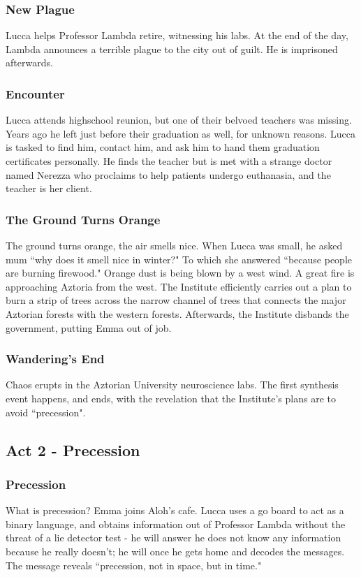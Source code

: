 \documentclass[11pt]{article}
\begin{document}
		\subsubsection{New Plague}
		Lucca helps Professor Lambda retire, witnessing his labs.
		At the end of the day, Lambda announces a terrible plague to the city out of guilt. 
		He is imprisoned afterwards.
		\subsubsection{Encounter}
		Lucca attends highschool reunion, but one of their belvoed teachers was missing.
		Years ago he left just before their graduation as well, for unknown reasons.
		Lucca is tasked to find him, contact him, and ask him to hand them graduation certificates personally.
		He finds the teacher but is met with a strange doctor named Nerezza who proclaims to help patients undergo euthanasia, and the teacher is her client.
		\subsubsection{The Ground Turns Orange}
		The ground turns orange, the air smells nice.
		When Lucca was small, he asked mum ``why does it smell nice in winter?"
		To which she answered ``because people are burning firewood."
		Orange dust is being blown by a west wind.
		A great fire is approaching Aztoria from the west. 
		The Institute efficiently carries out a plan to burn a strip of trees across the narrow channel of trees that connects the major Aztorian forests with the western forests.
		Afterwards, the Institute disbands the government, putting Emma out of job.
		\subsubsection{Wandering's End}
		Chaos erupts in the Aztorian University neuroscience labs. 
		The first synthesis event happens, and ends, with the revelation that the Institute's plans are to avoid ``precession".
	\newpage



	\subsection{Act 2 - Precession}
		\subsubsection{Precession}
		What is precession? 
		Emma joins Aloh's cafe.
		Lucca uses a go board to act as a binary language, and obtains information out of Professor Lambda without the threat of a lie detector test - he will answer he does not know any information because he really doesn't; he will once he gets home and decodes the messages.
		The message reveals ``precession, not in space, but in time."
\end{document}
